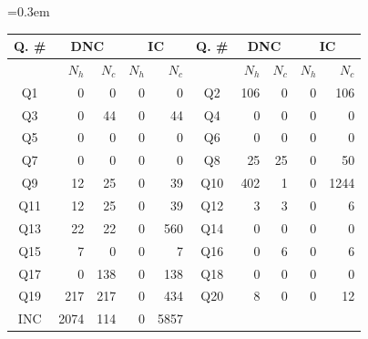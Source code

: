 \documentclass{llncs}
\begin{document}
\begin{table}[ht]
\begin{center}
\tabcolsep=0.3em
\renewcommand{\arraystretch}{1.3}
\begin{tabular}{|c|r|r|r|r||c|r|r|r|r|}\hline
Q. \#& \multicolumn{2}{|c|}{\textbf{DNC}} & \multicolumn{2}{|c||}{\textbf{IC}}&
Q. \#& \multicolumn{2}{|c|}{\textbf{DNC}} & \multicolumn{2}{|c|}{\textbf{IC}}\\
    \hline
        & $N_h$ & $N_c$ & $N_h$ &$N_c$  &
        & $N_h$ & $N_c$ & $N_h$ &$N_c$  \\
	\hline\hline
	Q1  & 0          & 0     & 0          & 0     &
	Q2  & 106        & 0     & 0          & 106   \\
	Q3  & 0          & 44    & 0          & 44    &
	Q4  & 0          & 0     & 0          & 0     \\
	Q5  & 0          & 0     & 0          & 0     &
	Q6  & 0          & 0     & 0          & 0     \\
	Q7  & 0          & 0     & 0          & 0     &
	Q8  & 25	     & 25    & 0          & 50    \\
	Q9  & 12	     & 25    & 0          & 39    &
	Q10 & 402	     & 1     & 0          & 1244  \\
	Q11 & 12	     & 25    & 0          & 39    &
	Q12 & 3          & 3     & 0          & 6     \\
	Q13 & 22	     & 22    & 0          & 560   &%
	Q14 & 0          & 0     & 0          & 0     \\
	Q15 & 7          & 0     & 0          & 7     &
	Q16 & 0          & 6     & 0          & 6     \\%
	Q17 & 0          & 138   & 0          & 138   &%
	Q18 & 0          & 0     & 0          & 0     \\
	Q19 & 217	     & 217   & 0          & 434   &%
	Q20 & 8          & 0     & 0          & 12    \\
    \hline
    INC
        & 2074  & 114   & 0          & 5857  &
    \multicolumn{5}{|c|}{}                              \\
	\hline
\end{tabular}

\end{center}
\end{table}
\end{document}
